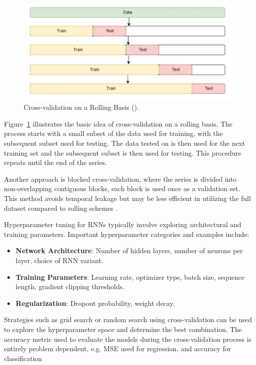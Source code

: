 \documentclass[conference]{IEEEtran}
\begin{document}
\begin{figure}[H]
  \centering
  \includegraphics[width=0.65\linewidth]{images/rolling_cv.png}
  \caption{Cross-validation on a Rolling Basis (\cite{time_series_cv}).}
  \label{fig:rolling_cv}
\end{figure}

Figure~\ref{fig:rolling_cv} illustrates the basic idea of cross-validation on a rolling basis. The process starts with a small subset of the data used for training, with the subsequent subset used for testing. The data tested on is then used for the next training set and the subsequent subset is then used for testing. This procedure repeats until the end of the series.

Another approach is blocked cross-validation, where the series is divided into non-overlapping contiguous blocks, each block is used once as a validation set. This method avoids temporal leakage but may be less efficient in utilizing the full dataset compared to rolling schemes \cite{time_series_cv}.

Hyperparameter tuning for RNNs typically involve exploring architectural and training parameters. Important hyperparameter categories and examples include:

\begin{itemize}
    \item \textbf{Network Architecture}: Number of hidden layers, number of neurons per layer, choice of RNN variant.
    \item \textbf{Training Parameters}: Learning rate, optimizer type, batch size, sequence length, gradient clipping thresholds.
    \item \textbf{Regularization}: Dropout probability, weight decay.
\end{itemize}

Strategies such as grid search or random search using cross-validation can be used to explore the hyperparameter space and determine the best combination. The accuracy metric used to evaluate the models during the cross-validation process is entirely problem dependent, e.g. MSE used for regression, and accuracy for classification
\end{document}
